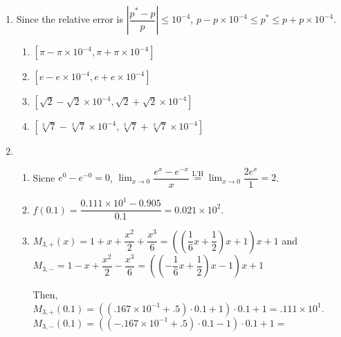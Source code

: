 \documentclass[12pt]{article}
\begin{document}
\begin{enumerate}
    \item Since the relative error is $\left|\dfrac{p^*-p}{p}\right| \leq 10^{-4}$, $p - p\times 10^{-4} \leq p^* \leq p + p\times 10^{-4}$.
    \begin{enumerate}
        \item $[\pi - \pi\times 10^{-4}, \pi + \pi\times 10^{-4}]$
        \item $[e - e\times 10^{-4}, e + e\times 10^{-4}]$
        \item $[\sqrt{2} - \sqrt{2}\times 10^{-4}, \sqrt{2} + \sqrt{2}\times 10^{-4}]$
        \item $[\sqrt[3]{7} - \sqrt[3]{7}\times 10^{-4}, \sqrt[3]{7} + \sqrt[3]{7}\times 10^{-4}]$
    \end{enumerate}

    \item \begin{enumerate}
        \item Sicne $e^{0} - e^{-0} = 0$, $\displaystyle\lim_{x \to 0} \dfrac{e^{x} - e^{-x}}{x} \overset{\text{L'H}}{=} \displaystyle\lim_{x\to 0} \dfrac{2e^{x}}{1} = 2$.
        \item $f(0.1) = \dfrac{0.111\times 10^1 - 0.905}{0.1} = 0.021\times 10^2$.
        \item $M_{3, +}(x) = 1 + x + \dfrac{x^2}{2} + \dfrac{x^3}{6} = ((\dfrac{1}{6}x + \dfrac{1}{2})x + 1)x + 1$ 
        and $M_{3, -} = 1 - x + \dfrac{x^2}{2} - \dfrac{x^3}{6} = ((-\dfrac{1}{6}x + \dfrac{1}{2})x - 1)x + 1$

        Then, $M_{3, +}(0.1) =  ((.167\times 10^{-1} + .5)\cdot 0.1 + 1) \cdot 0.1 + 1 = .111\times 10^{1}$.
        $M_{3, -}(0.1) = ((-.167\times 10^{-1} + .5)\cdot 0.1 - 1)\cdot 0.1 + 1 = $
    \end{enumerate}
\end{enumerate}
\end{document}
